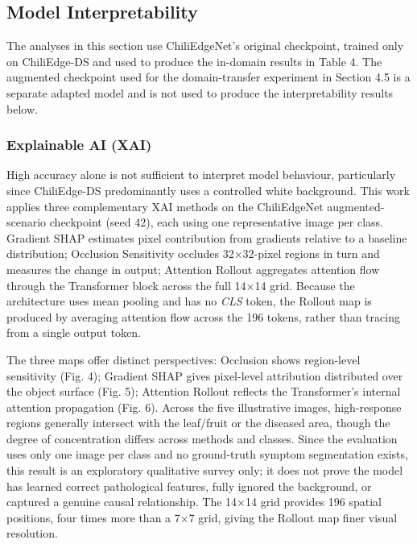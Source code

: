 \subsection{Model Interpretability}\label{model-interpretability}

The analyses in this section use ChiliEdgeNet's original checkpoint, trained only on ChiliEdge-DS and used to produce the in-domain results in Table 4. The augmented checkpoint used for the domain-transfer experiment in Section 4.5 is a separate adapted model and is not used to produce the interpretability results below.

\subsubsection{Explainable AI (XAI)}\label{explainable-ai-xai}

High accuracy alone is not sufficient to interpret model behaviour, particularly since ChiliEdge-DS predominantly uses a controlled white background. This work applies three complementary XAI methods on the ChiliEdgeNet augmented-scenario checkpoint (seed 42), each using one representative image per class. Gradient SHAP \cite{erion2021} estimates pixel contribution from gradients relative to a baseline distribution; Occlusion Sensitivity \cite{zeiler2014} occludes 32×32-pixel regions in turn and measures the change in output; Attention Rollout \cite{abnar2020} aggregates attention flow through the Transformer block across the full 14×14 grid. Because the architecture uses mean pooling and has no \emph{CLS} token, the Rollout map is produced by averaging attention flow across the 196 tokens, rather than tracing from a single output token.

The three maps offer distinct perspectives: Occlusion shows region-level sensitivity (Fig. 4); Gradient SHAP gives pixel-level attribution distributed over the object surface (Fig. 5); Attention Rollout reflects the Transformer's internal attention propagation (Fig. 6). Across the five illustrative images, high-response regions generally intersect with the leaf/fruit or the diseased area, though the degree of concentration differs across methods and classes. Since the evaluation uses only one image per class and no ground-truth symptom segmentation exists, this result is an exploratory qualitative survey only; it does not prove the model has learned correct pathological features, fully ignored the background, or captured a genuine causal relationship. The 14×14 grid provides 196 spatial positions, four times more than a 7×7 grid, giving the Rollout map finer visual resolution.

